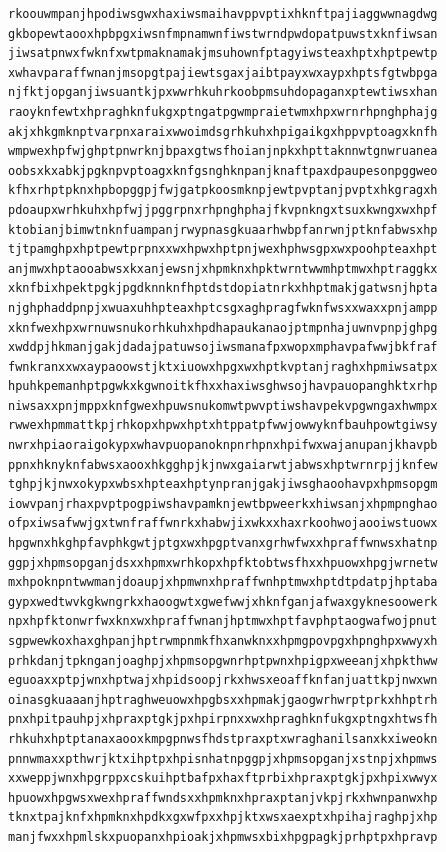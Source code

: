 \documentclass[11pt,letterpaper]{exam}
\begin{document}
\begin{questions}
\begin{verbatim}
rkoouwmpanjhpodiwsgwxhaxiwsmaihavppvptixhknftpajiaggwwnagdwg
gkbopewtaooxhpbpgxiwsnfmpnamwnfiwstwrndpwdopatpuwstxknfiwsan
jiwsatpnwxfwknfxwtpmaknamakjmsuhownfptagyiwsteaxhptxhptpewtp
xwhavparaffwnanjmsopgtpajiewtsgaxjaibtpayxwxaypxhptsfgtwbpga
njfktjopganjiwsuantkjpxwwrhkuhrkoobpmsuhdopaganxptewtiwsxhan
raoyknfewtxhpraghknfukgxptngatpgwmpraietwmxhpxwrnrhpnghphajg
akjxhkgmknptvarpnxaraixwwoimdsgrhkuhxhpigaikgxhppvptoagxknfh
wmpwexhpfwjghptpnwrknjbpaxgtwsfhoianjnpkxhpttaknnwtgnwruanea
oobsxkxabkjpgknpvptoagxknfgsnghknpanjknaftpaxdpaupesonpggweo
kfhxrhptpknxhpbopggpjfwjgatpkoosmknpjewtpvptanjpvptxhkgragxh
pdoaupxwrhkuhxhpfwjjpggrpnxrhpnghphajfkvpnkngxtsuxkwngxwxhpf
ktobianjbimwtnknfuampanjrwypnasgkuaarhwbpfanrwnjptknfabwsxhp
tjtpamghpxhptpewtprpnxxwxhpwxhptpnjwexhphwsgpxwxpoohpteaxhpt
anjmwxhptaooabwsxkxanjewsnjxhpmknxhpktwrntwwmhptmwxhptraggkx
xknfbixhpektpgkjpgdknnknfhptdstdopiatnrkxhhptmakjgatwsnjhpta
njghphaddpnpjxwuaxuhhpteaxhptcsgxaghpragfwknfwsxxwaxxpnjampp
xknfwexhpxwrnuwsnukorhkuhxhpdhapaukanaojptmpnhajuwnvpnpjghpg
xwddpjhkmanjgakjdadajpatuwsojiwsmanafpxwopxmphavpafwwjbkfraf
fwnkranxxwxaypaoowstjktxiuowxhpgxwxhptkvptanjraghxhpmiwsatpx
hpuhkpemanhptpgwkxkgwnoitkfhxxhaxiwsghwsojhavpauopanghktxrhp
niwsaxxpnjmppxknfgwexhpuwsnukomwtpwvptiwshavpekvpgwngaxhwmpx
rwwexhpmmattkpjrhkopxhpwxhptxhtppatpfwwjowwyknfbauhpowtgiwsy
nwrxhpiaoraigokypxwhavpuopanoknpnrhpnxhpifwxwajanupanjkhavpb
ppnxhknyknfabwsxaooxhkgghpjkjnwxgaiarwtjabwsxhptwrnrpjjknfew
tghpjkjnwxokypxwbsxhpteaxhptynpranjgakjiwsghaoohavpxhpmsopgm
iowvpanjrhaxpvptpogpiwshavpamknjewtbpweerkxhiwsanjxhpmpnghao
ofpxiwsafwwjgxtwnfraffwnrkxhabwjixwkxxhaxrkoohwojaooiwstuowx
hpgwnxhkghpfavphkgwtjptgxwxhpgptvanxgrhwfwxxhpraffwnwsxhatnp
ggpjxhpmsopganjdsxxhpmxwrhkopxhpfktobtwsfhxxhpuowxhpgjwrnetw
mxhpoknpntwwmanjdoaupjxhpmwnxhpraffwnhptmwxhptdtpdatpjhptaba
gypxwedtwvkgkwngrkxhaoogwtxgwefwwjxhknfganjafwaxgyknesoowerk
npxhpfktonwrfwxknxwxhpraffwnanjhptmwxhptfavphptaogwafwojpnut
sgpwewkoxhaxghpanjhptrwmpnmkfhxanwknxxhpmgpovpgxhpnghpxwwyxh
prhkdanjtpknganjoaghpjxhpmsopgwnrhptpwnxhpigpxweeanjxhpkthww
eguoaxxptpjwnxhptwajxhpidsoopjrkxhwsxeoaffknfanjuattkpjnwxwn
oinasgkuaaanjhptraghweuowxhpgbsxxhpmakjgaogwrhwrptprkxhhptrh
pnxhpitpauhpjxhpraxptgkjpxhpirpnxxwxhpraghknfukgxptngxhtwsfh
rhkuhxhptptanaxaooxkmpgpnwsfhdstpraxptxwraghanilsanxkxiweokn
pnnwmaxxpthwrjktxihptpxhpisnhatnpggpjxhpmsopganjxstnpjxhpmws
xxweppjwnxhpgrppxcskuihptbafpxhaxftprbixhpraxptgkjpxhpixwwyx
hpuowxhpgwsxwexhpraffwndsxxhpmknxhpraxptanjvkpjrkxhwnpanwxhp
tknxtpajknfxhpmknxhpdkxgxwfpxxhpjktxwsxaexptxhpihajraghpjxhp
manjfwxxhpmlskxpuopanxhpioakjxhpmwsxbixhpgpagkjprhptpxhpravp

\end{verbatim}
\end{questions}
\end{document}
